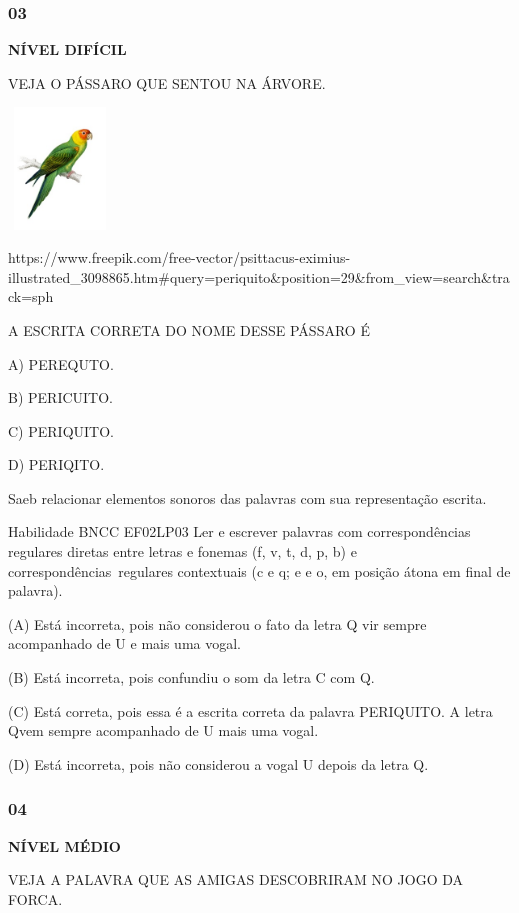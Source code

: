 \subsubsection{03}\label{section-129}

\textbf{NÍVEL DIFÍCIL}

VEJA O PÁSSARO QUE SENTOU NA ÁRVORE.

\includegraphics[width=1.08542in,height=1.27222in]{media/image165.jpeg}

https://www.freepik.com/free-vector/psittacus-eximius-illustrated\_3098865.htm\#query=periquito\&position=29\&from\_view=search\&track=sph

A ESCRITA CORRETA DO NOME DESSE PÁSSARO É

A) PEREQUTO.

B) PERICUITO.

C) PERIQUITO.

D) PERIQITO.

Saeb relacionar elementos sonoros das palavras com sua representação
escrita.

Habilidade BNCC EF02LP03 Ler e escrever palavras com correspondências
regulares diretas entre letras e fonemas (f, v, t, d, p, b) e
correspondências~regulares contextuais (c e q; e e o, em posição átona
em final de palavra).

(A) Está incorreta, pois não considerou o fato da letra Q vir sempre
acompanhado de U e mais uma vogal.

(B) Está incorreta, pois confundiu o som da letra C com Q.

(C) Está correta, pois essa é a escrita correta da palavra PERIQUITO. A
letra Qvem sempre acompanhado de U mais uma vogal.

(D) Está incorreta, pois não considerou a vogal U depois da letra Q.

\subsubsection{04 }\label{section-130}

\textbf{NÍVEL MÉDIO}

VEJA A PALAVRA QUE AS AMIGAS DESCOBRIRAM NO JOGO DA FORCA.

